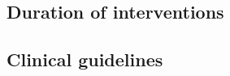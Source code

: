 \documentclass{elsart}
\begin{document}


\subsection{Duration of interventions}




\subsection{Clinical guidelines}







\end{document}
